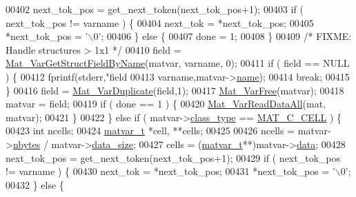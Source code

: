 \begin{DoxyCode}
{{{{{{00402                 next\_tok\_pos = get\_next\_token(next\_tok\_pos+1);
00403                 \textcolor{keywordflow}{if} ( next\_tok\_pos != varname ) \{
00404                     next\_tok = *next\_tok\_pos;
00405                     *next\_tok\_pos = \textcolor{charliteral}{'\(\backslash\)0'};
00406                 \} \textcolor{keywordflow}{else} \{
00407                     done = 1;
00408                 \}
00409                 \textcolor{comment}{/* FIXME: Handle structures > 1x1 */}
00410                 field = \hyperlink{group___m_a_t_ga619d241b49ce97334a38add60562c7be}{Mat\_VarGetStructFieldByName}(matvar, varname, 0);
00411                 \textcolor{keywordflow}{if} ( field == NULL ) \{
00412                     fprintf(stderr,\textcolor{stringliteral}{"field %
00413                         varname,matvar->\hyperlink{group___m_a_t_a5d4b55b041e3b4fb50c04337f05ad909}{name});
00414                     \textcolor{keywordflow}{break};
00415                 \}
00416                 field = \hyperlink{group___m_a_t_ga7ef80c5d99d7918b2b09db3bea106ecc}{Mat\_VarDuplicate}(field,1);
00417                 \hyperlink{group___m_a_t_ga1d14716f7450530fd1c9d02413787f0e}{Mat\_VarFree}(matvar);
00418                 matvar = field;
00419                 \textcolor{keywordflow}{if} ( done == 1 ) \{
00420                     \hyperlink{group___m_a_t_gaa8060d7c8e5da0aa9ee5f96e5f1eb30a}{Mat\_VarReadDataAll}(mat, matvar);
00421                 \}
00422             \} \textcolor{keywordflow}{else} \textcolor{keywordflow}{if} ( matvar->\hyperlink{group___m_a_t_aff13035bf3265dd7d9425e5d40c839d4}{class\_type} == \hyperlink{group___m_a_t_ggad4d60ae7b709fc81bfd744fb4c857c40a2f7abb47a1c51e248bd4e5e03cc81b08}{MAT\_C\_CELL} ) \{
00423                 \textcolor{keywordtype}{int} ncells;
00424                 \hyperlink{group___m_a_t_structmatvar__t}{matvar\_t} *cell, **cells;
00425 
00426                 ncells = matvar->\hyperlink{group___m_a_t_abf1c844540503be2df9bb3db93cfe307}{nbytes} / matvar->\hyperlink{group___m_a_t_a9ad1c82e2b568da617e12dc73a26e1f9}{data\_size};
00427                 cells = (\hyperlink{group___m_a_t_structmatvar__t}{matvar\_t}**)matvar->\hyperlink{group___m_a_t_a5672978efa230bbdecdf38ede781f7fa}{data};
00428                 next\_tok\_pos = get\_next\_token(next\_tok\_pos+1);
00429                 \textcolor{keywordflow}{if} ( next\_tok\_pos != varname ) \{
00430                     next\_tok = *next\_tok\_pos;
00431                     *next\_tok\_pos = \textcolor{charliteral}{'\(\backslash\)0'};
00432                 \} \textcolor{keywordflow}{else} \{
}}}}}}}
\end{DoxyCode}
